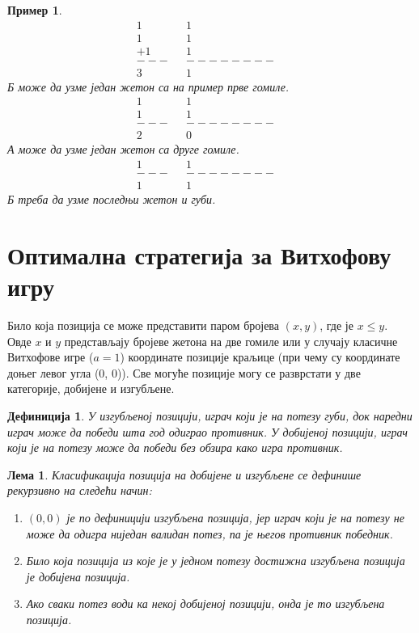 \documentclass[a4paper]{article}
\newtheorem{example}{Пример}
\newtheorem{lemma}{Лема}
\newtheorem{definition}{Дефиниција}
\begin{document}
\begin{example}
		\begin{align*}
			1&		&		1&\\
			1&		&       1&\\
			+1&		&  	  	1&\\
			---&	&--------&\\
			3&		&       1
		\end{align*}
	\textit{Б} може да узме један жетон са на пример прве гомиле.
		\begin{align*}
			1&		&		1&\\
			1&		&  	  	1&\\
			---&	&--------&\\
			2&		&       0
		\end{align*}
	\textit{А} може да узме један жетон са друге гомиле.
		\begin{align*}
			1&		&  	  	1&\\
			---&	&--------&\\
			1&		&       1
		\end{align*}
	\textit{Б} треба да узме последњи жетон и губи.
\end{example}

\section{Оптимална стратегија за Витхофову игру}
\label{sec:optimalna_strategija_vithof}

Било која позиција се може представити паром бројева $ (x, y) $, где је $ x \le  y $. Овде  $ x $ и $ y $ представљају бројеве жетона на две гомиле или у случају класичне Витхофове игре ($ a = 1 $) координате позиције краљице (при чему су координате доњег левог угла (0, 0)). Све могуће позиције могу се разврстати у две категорије, добијене и изгубљене.

\begin{definition}
	У изгубљеној позицији, играч који је на потезу губи, док наредни играч може да победи шта год одиграо противник. У добијеној позицији, играч који је на потезу може да победи без обзира како игра противник.
\end{definition}

\begin{lemma}
	Класификација позиција на добијене и изгубљене се дефинише рекурзивно на следећи начин:
		\begin{enumerate}
			\item $ (0, 0) $ је по дефиницији изгубљена позиција, јер играч који је на потезу не може да одигра ниједан валидан потез, па је његов противник победник.
			\item Било која позиција из које је у једном потезу достижна изгубљена позиција је добијена позиција.
			\item Ако сваки потез води ка некој добијеној позицији, онда је то изгубљена позиција.
		\end{enumerate}	
\end{lemma}
\end{document}
